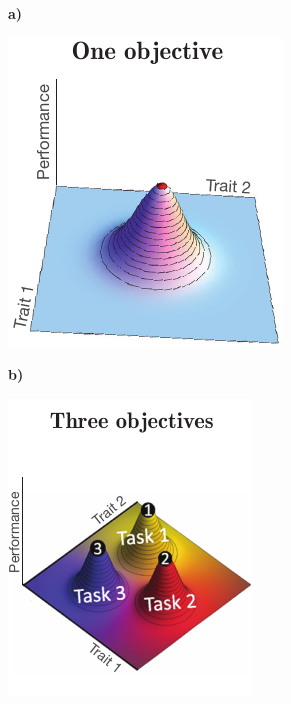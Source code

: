 \begin{figure}
	\centering
	\textbf{a)}
	\begin{minipage}[l]{0.40\textwidth}
	\centering
		\includegraphics[width=\textwidth]{figures/objectivePerformance}
	\end{minipage}
	\textbf{b)}
	\hspace{0.2cm}
	\begin{minipage}[r]{0.40\textwidth}
		\centering
		\includegraphics[width=\textwidth]{figures/objectivePerformance3}

\end{minipage}
\end{figure}
